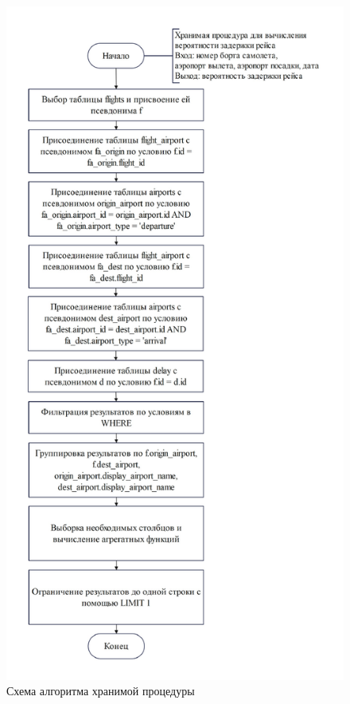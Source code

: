 \begin{figure}[H]
    \centering
    \includegraphics[scale=0.8]{inc/Drawing5}
    \caption{Схема алгоритма хранимой процедуры}
    \label{fig:procedure}
\end{figure}

